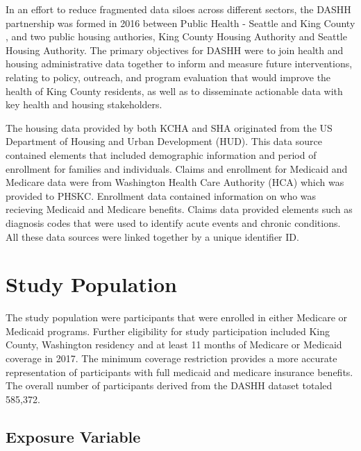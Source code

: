 \documentclass [11pt, proquest] {uwthesis}[2015/03/03]
\begin{document}
In an effort to reduce fragmented data siloes across different sectors,
the DASHH partnership was formed in 2016 between Public Health - Seattle
and King County , and two public housing authories, King County Housing
Authority and Seattle Housing Authority. The primary objectives for
DASHH were to join health and housing administrative data together to
inform and measure future interventions, relating to policy, outreach,
and program evaluation that would improve the health of King County
residents, as well as to disseminate actionable data with key health and
housing stakeholders.

The housing data provided by both KCHA and SHA originated from the US
Department of Housing and Urban Development (HUD). This data source
contained elements that included demographic information and period of
enrollment for families and individuals. Claims and enrollment for
Medicaid and Medicare data were from Washington Health Care Authority
(HCA) which was provided to PHSKC. Enrollment data contained information
on who was recieving Medicaid and Medicare benefits. Claims data
provided elements such as diagnosis codes that were used to identify
acute events and chronic conditions. All these data sources were linked
together by a unique identifier ID.

\section{Study Population}\label{study-population}

The study population were participants that were enrolled in either
Medicare or Medicaid programs. Further eligibility for study
participation included King County, Washington residency and at least 11
months of Medicare or Medicaid coverage in 2017. The minimum coverage
restriction provides a more accurate representation of participants with
full medicaid and medicare insurance benefits. The overall number of
participants derived from the DASHH dataset totaled 585,372.

\subsection{Exposure Variable}\label{exposure-variable}
\end{document}

